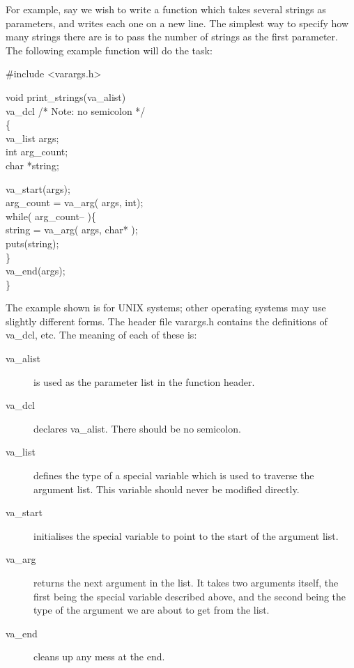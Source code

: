 For example, say we wish to write a function which takes several
strings as parameters, and writes each one on a new line. The
simplest way to specify how many strings there are is to pass the
number of strings as the first parameter. The following example
function will do the task:
\begin{code}
\#include <varargs.h> 								\addVspace

void print\_strings(va\_alist)				   \\
\> va\_dcl \tab	/* Note: no semicolon */  \\
\{	\+														\\
	va\_list args;										\\
	int arg\_count;									\\
	char *string;										\addVspace

	va\_start(args);									\\
	arg\_count = va\_arg( args, int);			\\
	while( arg\_count-- )\{ \+						\\
		string = va\_arg( args, char* );			\\
		puts(string);								 \-\\
	\}														\\
	va\_end(args);									 \-\\
\}
\end{code}
\noindent
The example shown is for UNIX systems; other operating systems may
use slightly different forms. The header file {\fn varargs.h}
contains the definitions of {\cd va\_dcl}, etc. The meaning of each of
these is:
\begin{description}
\item[\cd va\_alist] is used as the parameter list in the
function header.
\item[\cd va\_dcl] declares {\cd va\_alist}. There should be
no semicolon.
\item[\cd va\_list] defines the type of a special variable
which is used to traverse the argument list. This variable should
never be modified directly.
\item[\cd va\_start] initialises the special variable to point
to the start of the argument list.
\item[\cd va\_arg] returns the next argument in the list. It
takes two arguments itself, the first being the special variable
described above, and the second being the type of the argument we are
about to get from the list.
\item[\cd va\_end] cleans up any mess at the end.
\end{description}

